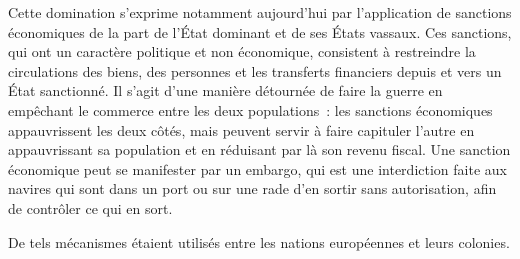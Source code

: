 \documentclass[a4paper,notitlepage]{article}
\newcommand{\eng}[1]{{\NoAutoSpaceBeforeFDP\emph{#1}}}  %
\begin{document}


Cette domination s'exprime notamment aujourd'hui par l'application de sanctions économiques de la part de l'État dominant et de ses États vassaux. Ces sanctions, qui ont un caractère politique et non économique, consistent à restreindre la circulations des biens, des personnes et les transferts financiers depuis et vers un État sanctionné. Il s'agit d'une manière détournée de faire la guerre en empêchant le commerce entre les deux populations~: les sanctions économiques appauvrissent les deux côtés, mais peuvent servir à faire capituler l'autre en appauvrissant sa population et en réduisant par là son revenu fiscal. Une sanction économique peut se manifester par un embargo, qui est une interdiction faite aux navires qui sont dans un port ou sur une rade d'en sortir sans autorisation, afin de contrôler ce qui en sort.


De tels mécanismes étaient utilisés entre les nations européennes et leurs colonies.
\end{document}
